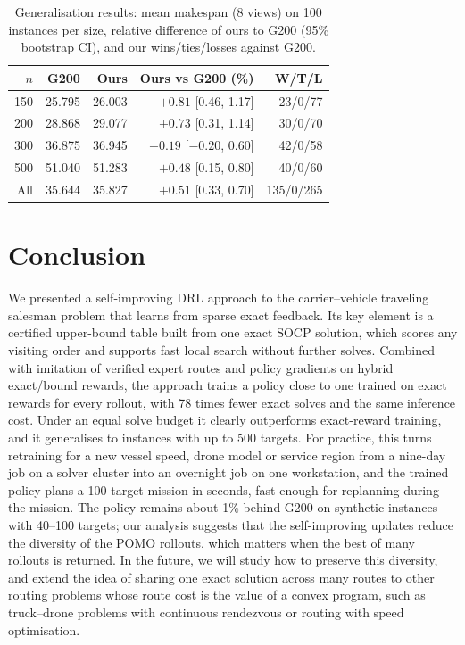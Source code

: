\documentclass[preprint,review,12pt,authoryear]{elsarticle}
\begin{document}
\begin{table}[t]\centering\small
\caption{Generalisation results: mean makespan (8 views) on 100 instances per size, relative difference of ours
to G200 (95\% bootstrap CI), and our wins/ties/losses against G200.}\label{tab:general}
\begin{tabular}{rrrrr}
\toprule
$n$ & G200 & Ours & Ours vs G200 (\%) & W/T/L \\
\midrule
150 & 25.795 & 26.003 & $+0.81$ [0.46, 1.17] & 23/0/77 \\
200 & 28.868 & 29.077 & $+0.73$ [0.31, 1.14] & 30/0/70 \\
300 & 36.875 & 36.945 & $+0.19$ [$-0.20$, 0.60] & 42/0/58 \\
500 & 51.040 & 51.283 & $+0.48$ [0.15, 0.80] & 40/0/60 \\
\midrule
All & 35.644 & 35.827 & $+0.51$ [0.33, 0.70] & 135/0/265 \\
\bottomrule
\end{tabular}
\end{table}

\section{Conclusion}\label{sec:conc}
We presented a self-improving DRL approach to the carrier--vehicle traveling salesman problem that learns from
sparse exact feedback. Its key element is a certified upper-bound table built from one exact SOCP solution, which
scores any visiting order and supports fast local search without further solves. Combined with imitation of
verified expert routes and policy gradients on hybrid exact/bound rewards, the approach trains a policy close to
one trained on exact rewards for every rollout, with 78 times fewer exact solves and the same inference cost. Under
an equal solve budget it clearly outperforms exact-reward training, and it generalises to instances with up to 500
targets. For practice, this turns retraining for a new vessel speed, drone model or service region from a
nine-day job on a solver cluster into an overnight job on one workstation, and the trained policy plans a
100-target mission in seconds, fast enough for replanning during the mission.
The policy remains about 1\% behind G200 on synthetic instances with 40--100 targets; our analysis suggests that
the self-improving updates reduce the diversity of the POMO rollouts, which matters when the best of many rollouts
is returned. In the future, we will study how to preserve this diversity, and extend the idea of sharing one exact
solution across many routes to other routing problems whose route cost is the value of a convex program, such as
truck--drone problems with continuous rendezvous or routing with speed optimisation.
\end{document}
